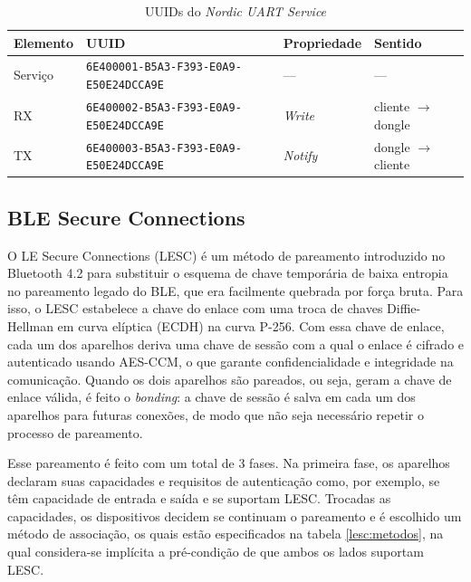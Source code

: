\begin{table}[htb]
\centering
\caption{UUIDs do \textit{Nordic UART Service}}
\label{tab:nus}
\begin{tabular}{llll}
\hline
Elemento & UUID & Propriedade & Sentido \\ \hline
Serviço & \texttt{6E400001-B5A3-F393-E0A9-E50E24DCCA9E} & --- & --- \\
RX & \texttt{6E400002-B5A3-F393-E0A9-E50E24DCCA9E} & \textit{Write} & cliente $\rightarrow$ dongle \\
TX & \texttt{6E400003-B5A3-F393-E0A9-E50E24DCCA9E} & \textit{Notify} & dongle $\rightarrow$ cliente \\ \hline
\end{tabular}
\end{table}


\subsection{BLE Secure Connections} 

O LE Secure Connections (LESC) é um método de pareamento introduzido no Bluetooth 4.2 para substituir o esquema de chave temporária de baixa entropia no pareamento legado
do BLE, que era facilmente quebrada por força bruta. Para isso, o LESC estabelece a chave do enlace com uma troca de chaves Diffie-Hellman em curva elíptica (ECDH)
na curva P-256. Com essa chave de enlace, cada um dos aparelhos deriva uma chave de sessão com a qual o enlace é cifrado e autenticado usando AES-CCM, o que garante 
confidencialidade e integridade na comunicação. Quando os dois aparelhos são pareados, ou seja, geram a chave de enlace válida, é feito o \textit{bonding}: a chave de sessão
é salva em cada um dos aparelhos para futuras conexões, de modo que não seja necessário repetir o processo de pareamento.

Esse pareamento é feito com um total de 3 fases. Na primeira fase, os aparelhos declaram suas capacidades e requisitos de autenticação como, por exemplo, se têm capacidade
de entrada e saída e se suportam LESC. Trocadas as capacidades, os dispositivos decidem se continuam o pareamento e é escolhido um método de associação, os quais estão especificados
na tabela \ref{lesc:metodos}, na qual considera-se implícita a pré-condição de que ambos os lados suportam LESC.



